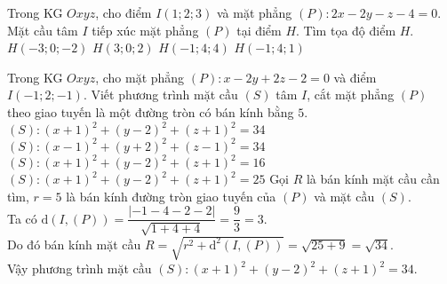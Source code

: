 \begin{ex}%
	Trong KG $Oxyz$, cho điểm $I(1;2;3)$ và mặt phẳng $(P):2x-2y-z-4=0.$ Mặt cầu tâm $I$ tiếp xúc mặt phẳng $(P)$  tại điểm $H$.
	Tìm tọa độ điểm $H$.
	\choice
	{$H(-3;0;-2)$}
	{\True $H(3;0;2)$}
	{$H(-1;4;4)$}
	{$H(-1;4;1)$}
\end{ex}
\begin{ex}%
	Trong KG $Oxyz$, cho mặt phẳng $(P)\colon x-2y+2z-2=0$ và điểm $I(-1;2;-1)$. Viết phương trình mặt cầu $(S)$ tâm $I$, cắt mặt phẳng $(P)$ theo giao tuyến là một đường tròn có bán kính bằng $5$.
	\choice
	{\True $(S)\colon (x+1)^2+(y-2)^2+(z+1)^2=34$}
	{$(S)\colon (x-1)^2+(y+2)^2+(z-1)^2=34$}
	{$(S)\colon (x+1)^2+(y-2)^2+(z+1)^2=16$}
	{$(S)\colon (x+1)^2+(y-2)^2+(z+1)^2=25$}
	\loigiai
	{Gọi $R$ là bán kính mặt cầu cần tìm, $r=5$ là bán kính đường tròn giao tuyến của $(P)$ và mặt cầu $(S)$.\\
		Ta có $\mathrm{d}(I,(P))=\dfrac{|-1-4-2-2|}{\sqrt{1+4+4}}=\dfrac{9}{3}=3$.\\
		Do đó bán kính mặt cầu $R=\sqrt{r^2+\mathrm{d}^2(I,(P))}=\sqrt{25+9}=\sqrt{34}$.\\
		Vậy phương trình mặt cầu $(S)\colon (x+1)^2+(y-2)^2+(z+1)^2=34$.}
\end{ex}

